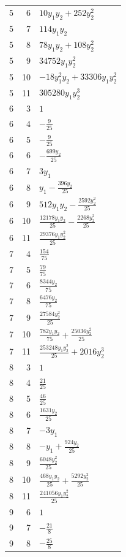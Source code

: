 \documentclass[10pt,a4paper]{article}
\begin{document}
{\begin{longtable}{rrp{125mm}}
5 & 6 & $10 y_{1} y_{2} + 252 y_{2}^{2}$\\
5 & 7 & $114 y_{1} y_{2}$\\
5 & 8 & $78 y_{1} y_{2} + 108 y_{2}^{2}$\\
5 & 9 & $34752 y_{1} y_{2}^{2}$\\
5 & 10 & $- 18 y_{1}^{2} y_{2} + 33306 y_{1} y_{2}^{2}$\\
5 & 11 & $305280 y_{1} y_{2}^{3}$\\
6 & 3 & $1$\\
6 & 4 & $- \frac{9}{25}$\\
6 & 5 & $- \frac{9}{25}$\\
6 & 6 & $- \frac{699 y_{2}}{25}$\\
6 & 7 & $3 y_{1}$\\
6 & 8 & $y_{1} - \frac{396 y_{2}}{25}$\\
6 & 9 & $512 y_{1} y_{2} - \frac{2592 y_{2}^{2}}{25}$\\
6 & 10 & $\frac{12178 y_{1} y_{2}}{25} - \frac{2268 y_{2}^{2}}{25}$\\
6 & 11 & $\frac{29376 y_{1} y_{2}^{2}}{25}$\\
7 & 4 & $\frac{154}{75}$\\
7 & 5 & $\frac{79}{75}$\\
7 & 6 & $\frac{8344 y_{2}}{75}$\\
7 & 8 & $\frac{6476 y_{2}}{75}$\\
7 & 9 & $\frac{27584 y_{2}^{2}}{25}$\\
7 & 10 & $\frac{782 y_{1} y_{2}}{75} + \frac{25036 y_{2}^{2}}{25}$\\
7 & 11 & $\frac{253248 y_{1} y_{2}^{2}}{25} + 2016 y_{2}^{3}$\\
8 & 3 & $1$\\
8 & 4 & $\frac{21}{25}$\\
8 & 5 & $\frac{46}{25}$\\
8 & 6 & $\frac{1631 y_{2}}{25}$\\
8 & 7 & $- 3 y_{1}$\\
8 & 8 & $- y_{1} + \frac{924 y_{2}}{25}$\\
8 & 9 & $\frac{6048 y_{2}^{2}}{25}$\\
8 & 10 & $\frac{468 y_{1} y_{2}}{25} + \frac{5292 y_{2}^{2}}{25}$\\
8 & 11 & $\frac{241056 y_{1} y_{2}^{2}}{25}$\\
9 & 6 & $1$\\
9 & 7 & $- \frac{21}{8}$\\
9 & 8 & $- \frac{25}{8}$\\

\end{longtable}}
\end{document}

